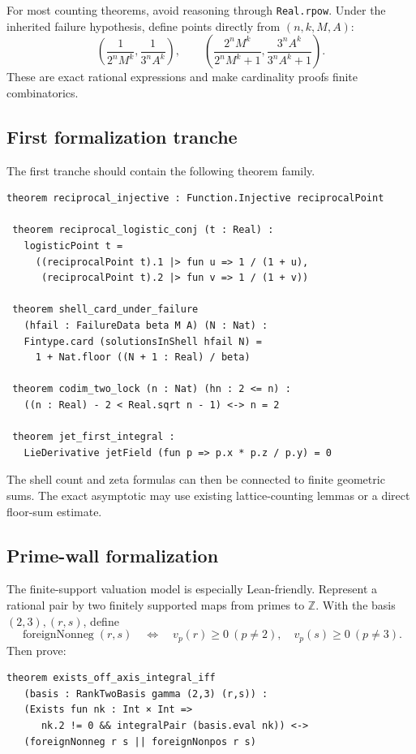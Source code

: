 \documentclass[10pt,oneside]{article}
\theoremstyle{definition}
\theoremstyle{remark}
\newcommand{\Z}{\mathbb Z}
\begin{document}
For most counting theorems, avoid reasoning through \texttt{Real.rpow}.  Under the inherited failure hypothesis, define points directly from \((n,k,M,A)\):
\[
 \left(\frac1{2^nM^k},\frac1{3^nA^k}\right),
 \qquad
 \left(\frac{2^nM^k}{2^nM^k+1},
       \frac{3^nA^k}{3^nA^k+1}\right).
\]
These are exact rational expressions and make cardinality proofs finite combinatorics.

\subsection{First formalization tranche}
The first tranche should contain the following theorem family.

\begin{lstlisting}[style=code,language={},caption={First-tranche theorem signatures; schematic.}]
 theorem reciprocal_injective : Function.Injective reciprocalPoint

 theorem reciprocal_logistic_conj (t : Real) :
   logisticPoint t =
     ((reciprocalPoint t).1 |> fun u => 1 / (1 + u),
      (reciprocalPoint t).2 |> fun v => 1 / (1 + v))

 theorem shell_card_under_failure
   (hfail : FailureData beta M A) (N : Nat) :
   Fintype.card (solutionsInShell hfail N) =
     1 + Nat.floor ((N + 1 : Real) / beta)

 theorem codim_two_lock (n : Nat) (hn : 2 <= n) :
   ((n : Real) - 2 < Real.sqrt n - 1) <-> n = 2

 theorem jet_first_integral :
   LieDerivative jetField (fun p => p.x * p.z / p.y) = 0
\end{lstlisting}

The shell count and zeta formulas can then be connected to finite geometric sums.  The exact asymptotic may use existing lattice-counting lemmas or a direct floor-sum estimate.

\subsection{Prime-wall formalization}
The finite-support valuation model is especially Lean-friendly.  Represent a rational pair by two finitely supported maps from primes to \(\Z\).  With the basis \((2,3),(r,s)\), define
\[
 \operatorname{foreignNonneg}(r,s)
 \quad\Longleftrightarrow\quad
 v_p(r)\ge0\ (p\ne2),\quad v_p(s)\ge0\ (p\ne3).
\]
Then prove:

\begin{lstlisting}[style=code,language={},caption={Prime-wall theorem skeleton.}]
 theorem exists_off_axis_integral_iff
   (basis : RankTwoBasis gamma (2,3) (r,s)) :
   (Exists fun nk : Int × Int =>
      nk.2 != 0 && integralPair (basis.eval nk)) <->
   (foreignNonneg r s || foreignNonpos r s)
\end{lstlisting}
\end{document}
